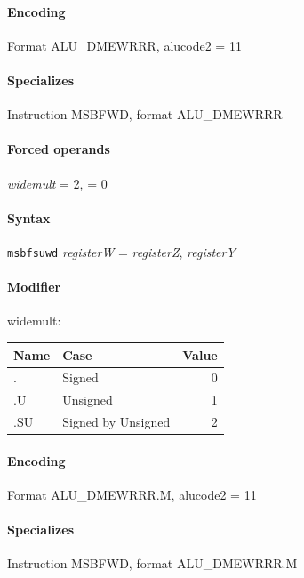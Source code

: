 {\paragraph{Encoding} Format \textsf{ALU\_DMEWRRR, alucode2 = 11}\\



\paragraph{Specializes} Instruction MSBFWD, format ALU\_DMEWRRR

\paragraph{Forced operands} \emph{widemult} = 2, \emph{} = 0

\paragraph{Syntax} \texttt{msbfsuwd} \emph{registerW} = \emph{registerZ}, \emph{registerY}

\paragraph{Modifier} \textsf{widemult}:\\

\noindent \begin{tabular}{|l|l|r|} \hline
\bf{Name} & \bf{Case} & \bf{Value} \\ \hline
. & Signed & 0 \\
.U & Unsigned & 1 \\
.SU & Signed by Unsigned & 2 \\
\hline \end{tabular}

\paragraph{Encoding} Format \textsf{ALU\_DMEWRRR.M, alucode2 = 11}\\



\paragraph{Specializes} Instruction MSBFWD, format ALU\_DMEWRRR.M

}
